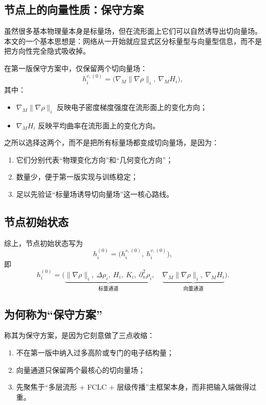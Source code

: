 \documentclass[12pt,a4paper]{ctexart}
\begin{document}
\subsection{节点上的向量性质：保守方案}

虽然很多基本物理量本身是标量场，但在流形面上它们可以自然诱导出切向量场。本文的一个基本思想是：网络从一开始就应显式区分标量型与向量型信息，而不是把方向性完全隐式吸收掉。

在第一版保守方案中，仅保留两个切向量场：
\[
h_i^{v,(0)}
=
\Big(
\nabla_M \|\nabla\rho\|_i,\
\nabla_M H_i
\Big),
\]
其中：
\begin{itemize}[leftmargin=2em]
    \item \(\nabla_M \|\nabla\rho\|_i\) 反映电子密度梯度强度在流形面上的变化方向；
    \item \(\nabla_M H_i\) 反映平均曲率在流形面上的变化方向。
\end{itemize}

之所以选择这两个，而不是把所有标量场都变成切向量场，是因为：
\begin{enumerate}[leftmargin=2em]
    \item 它们分别代表“物理变化方向”和“几何变化方向”；
    \item 数量少，便于第一版实现与训练稳定；
    \item 足以先验证“标量场诱导切向量场”这一核心路线。
\end{enumerate}

\subsection{节点初始状态}

综上，节点初始状态写为
\[
h_i^{(0)}
=
\big(
h_i^{s,(0)},\ h_i^{v,(0)}
\big),
\]
即
\[
h_i^{(0)}
=
\Big(
\underbrace{
\|\nabla\rho\|_i,\
\Delta\rho_i,\
H_i,\
K_i,\
\partial_n^2\rho_i
}_{\text{标量通道}},
\quad
\underbrace{
\nabla_M \|\nabla\rho\|_i,\
\nabla_M H_i
}_{\text{向量通道}}
\Big).
\]

\subsection{为何称为“保守方案”}

称其为保守方案，是因为它刻意做了三点收缩：
\begin{enumerate}[leftmargin=2em]
    \item 不在第一版中纳入过多高阶或专门的电子结构量；
    \item 向量通道只保留两个最核心的切向量场；
    \item 先聚焦于“多层流形 + FCLC + 层级传播”主框架本身，而非把输入端做得过重。
\end{enumerate}
\end{document}
